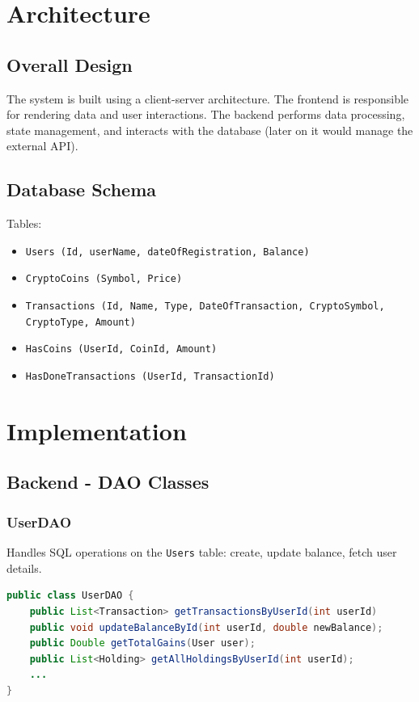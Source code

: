 \documentclass[a4paper,12pt]{article}
\begin{document}
\section{Architecture}
\subsection{Overall Design}
The system is built using a client-server architecture. The frontend is responsible for rendering data and user interactions. The backend performs data processing, state management, and interacts with the database (later on it would manage the external API).

\subsection{Database Schema}
Tables:
\begin{itemize}
    \item \texttt{Users (Id, userName, dateOfRegistration, Balance)}
    \item \texttt{CryptoCoins (Symbol, Price)}
    \item \texttt{Transactions (Id, Name, Type, DateOfTransaction, CryptoSymbol, CryptoType, Amount)}
    \item \texttt{HasCoins (UserId, CoinId, Amount)}
    \item \texttt{HasDoneTransactions (UserId, TransactionId)}
\end{itemize}

\section{Implementation}
\subsection{Backend - DAO Classes}
\subsubsection{UserDAO}
Handles SQL operations on the \texttt{Users} table: create, update balance, fetch user details.

\begin{lstlisting}[language=Java]
public class UserDAO {
    public List<Transaction> getTransactionsByUserId(int userId)
    public void updateBalanceById(int userId, double newBalance);
    public Double getTotalGains(User user);
    public List<Holding> getAllHoldingsByUserId(int userId);
    ...
}
\end{lstlisting}
\end{document}
